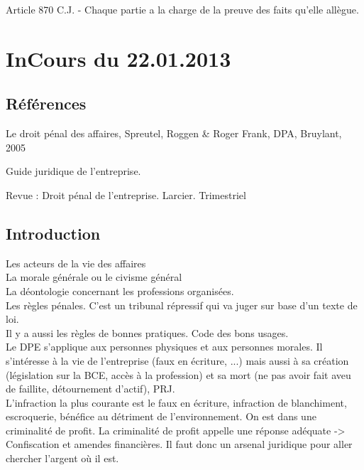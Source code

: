 \documentclass{book}
\begin{document}
Article 870 C.J. - Chaque partie a la charge de la preuve des faits qu'elle allègue.























\chapter{InCours du 22.01.2013}
 \setcounter{page}{1} 

\section{Références}
Le droit pénal des affaires, Spreutel, Roggen & Roger Frank, DPA, Bruylant, 2005

Guide juridique de l'entreprise.

Revue : Droit pénal de l'entreprise. Larcier. Trimestriel
\section{Introduction}

Les acteurs de la vie des affaires\\
La morale générale ou le civisme général\\
La déontologie concernant les professions organisées.\\
Les règles pénales. C'est un tribunal répressif qui va juger sur base d'un texte de loi.\\

Il y a aussi les règles de bonnes pratiques. Code des bons usages.		\\

Le DPE s'applique aux personnes physiques et aux personnes morales. Il s'intéresse à la vie de l'entreprise (faux en écriture, ...) mais aussi à sa création (législation sur la BCE, accès à la profession) et sa mort (ne pas avoir fait aveu de faillite, détournement d'actif), PRJ.\\

L'infraction la plus courante est le faux en écriture, infraction de blanchiment, escroquerie, bénéfice au détriment de l'environnement. On est dans une criminalité de profit. La criminalité de profit appelle une réponse adéquate -> Confiscation et amendes financières. Il faut donc un arsenal juridique pour aller chercher l'argent où il est.\\
\end{document}
